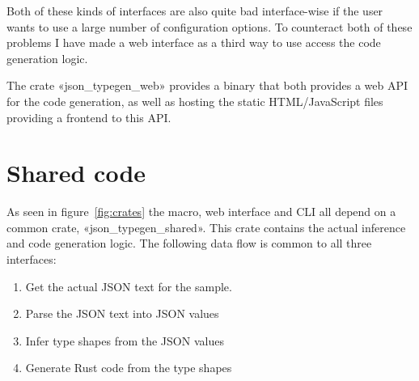 Both of these kinds of interfaces are also quite bad interface-wise if the user wants to use a large number of configuration options. To counteract both of these problems I have made a web interface as a third way to use access the code generation logic.

The crate «json_typegen_web» provides a binary that both provides a web API for the code generation, as well as hosting the static HTML/JavaScript files providing a frontend to this API.

\section{Shared code}

As seen in figure~\ref{fig:crates} the macro, web interface and CLI all depend on a common crate, «json_typegen_shared». This crate contains the actual inference and code generation logic. The following data flow is common to all three interfaces:

\begin{enumerate}
  \item Get the actual JSON text for the sample.
  \item Parse the JSON text into JSON values
  \item Infer type shapes from the JSON values
  \item Generate Rust code from the type shapes
\end{enumerate}
